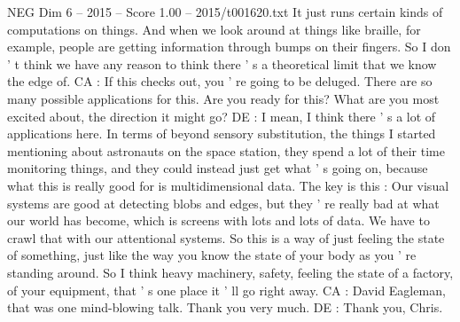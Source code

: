 \begin{textsample}{NEG Dim 6 – 2015 – Score 1.00 – 2015/t001620.txt}
It just runs certain kinds of computations on things.
And when we look around at things like braille, for example, people are getting information through bumps on their fingers.
So I don ' t think we have any reason to think there ' s a theoretical limit that we know the edge of.
CA : If this checks out, you ' re going to be deluged.
There are so many possible applications for this.
Are you ready for this?
What are you most excited about, the direction it might go?
DE : I mean, I think there ' s a lot of applications here.
In terms of beyond sensory substitution, the things I started mentioning about astronauts on the space station, they spend a lot of their time monitoring things, and they could instead just get what ' s going on, because what this is really good for is multidimensional data.
The key is this : Our visual systems are good at detecting blobs and edges, but they ' re really bad at what our world has become, which is screens with lots and lots of data.
We have to crawl that with our attentional systems.
So this is a way of just feeling the state of something, just like the way you know the state of your body as you ' re standing around.
So I think heavy machinery, safety, feeling the state of a factory, of your equipment, that ' s one place it ' ll go right away.
CA : David Eagleman, that was one mind-blowing talk.
Thank you very much.
DE : Thank you, Chris.

\end{textsample}
